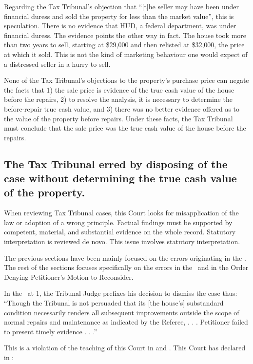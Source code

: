 \documentclass[12pt,\documentclassflag]{michiganCourtOfAppealsBrief}
\def\mathieuGast{\pincite[l]{MCL}{211.27(2)}}
\begin{document}
{Regarding the Tax Tribunal's objection that ``[t]he seller may have been under financial duress and sold the property for less than the market value'', this is speculation. There is no evidence that HUD, a federal department, was under financial duress. The evidence points the other way in fact. The house took more than two years to sell, starting at \$29,000 and then relisted at \$32,000, the price at which it sold. This is not the kind of marketing behaviour one would expect of a distressed seller in a hurry to sell.

None of the Tax Tribunal's objections to the property's purchase price can negate the facts that 1) the sale price is evidence of the true cash value of the house before the repairs, 2) to resolve the \mathieuGast analysis, it is necessary to determine the before-repair true cash value, and 3) there was no better evidence offered as to the value of the property before repairs. Under these facts, the Tax Tribunal must conclude that the sale price was the true cash value of the house before the repairs.

\subsection{The Tax Tribunal erred by disposing of the case without determining the true cash value of the property.}

When reviewing Tax Tribunal cases, this Court looks for misapplication of the law or adoption of a wrong principle. Factual findings must be supported by competent, material, and substantial evidence on the whole record. Statutory interpretation is reviewed de novo.  This issue involves statutory interpretation.

The previous sections have been mainly focused on the errors originating in the \POJ. The rest of the sections focuses specifically on the errors in the \FOJ\ and in the Order Denying Petitioner's Motion to Reconsider.

In the \FOJ\ at 1, the Tribunal Judge prefixes his decision to dismiss the case thus: ``Though the Tribunal is not persuaded that its [the house's] substandard condition necessarily renders all subsequent improvements outside the scope of normal repairs and maintenance as indicated by the Referee, . . . Petitioner failed to present timely evidence . . .''

This is a violation of the teaching of this Court in \cite{Jones & Laughlin} and \cite{Fisher}. This Court has declared in :

}
\end{document}
